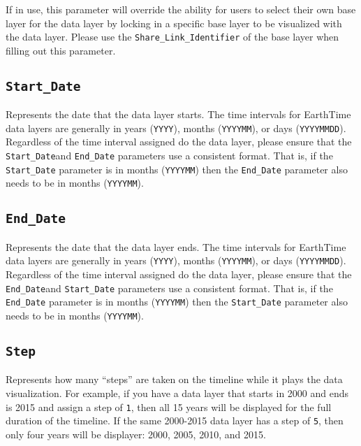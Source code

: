 \documentclass[
]{krantz}
\begin{document}
If in use, this parameter will override the ability for users to select their own base layer for the data layer by locking in a specific base layer to be visualized with the data layer. Please use the \texttt{Share\_Link\_Identifier} of the base layer when filling out this parameter.

\hypertarget{start_date}{%
\subsection*{\texorpdfstring{\texttt{Start\_Date}}{Start\_Date}}\label{start_date}}


Represents the date that the data layer starts. The time intervals for EarthTime data layers are generally in years (\texttt{YYYY}), months (\texttt{YYYYMM}), or days (\texttt{YYYYMMDD}). Regardless of the time interval assigned do the data layer, please ensure that the \texttt{Start\_Date}and \texttt{End\_Date} parameters use a consistent format. That is, if the \texttt{Start\_Date} parameter is in months (\texttt{YYYYMM}) then the \texttt{End\_Date} parameter also needs to be in months (\texttt{YYYYMM}).

\hypertarget{end_date}{%
\subsection*{\texorpdfstring{\texttt{End\_Date}}{End\_Date}}\label{end_date}}


Represents the date that the data layer ends. The time intervals for EarthTime data layers are generally in years (\texttt{YYYY}), months (\texttt{YYYYMM}), or days (\texttt{YYYYMMDD}). Regardless of the time interval assigned do the data layer, please ensure that the \texttt{End\_Date}and \texttt{Start\_Date} parameters use a consistent format. That is, if the \texttt{End\_Date} parameter is in months (\texttt{YYYYMM}) then the \texttt{Start\_Date} parameter also needs to be in months (\texttt{YYYYMM}).

\hypertarget{step}{%
\subsection*{\texorpdfstring{\texttt{Step}}{Step}}\label{step}}


Represents how many ``steps'' are taken on the timeline while it plays the data visualization. For example, if you have a data layer that starts in 2000 and ends is 2015 and assign a step of \texttt{1}, then all 15 years will be displayed for the full duration of the timeline. If the same 2000-2015 data layer has a step of \texttt{5}, then only four years will be displayer: 2000, 2005, 2010, and 2015.
\end{document}

